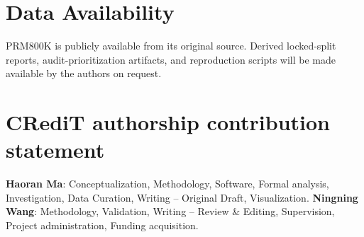 \documentclass[a4paper,fleqn]{cas-sc}
\begin{document}
\section*{Data Availability}
PRM800K is publicly available from its original source. Derived locked-split reports, audit-prioritization artifacts, and reproduction scripts will be made available by the authors on request.

\section*{CRediT authorship contribution statement}
\textbf{Haoran Ma}: Conceptualization, Methodology, Software, Formal analysis, Investigation, Data Curation, Writing -- Original Draft, Visualization. \textbf{Ningning Wang}: Methodology, Validation, Writing -- Review \& Editing, Supervision, Project administration, Funding acquisition.



\end{document}

